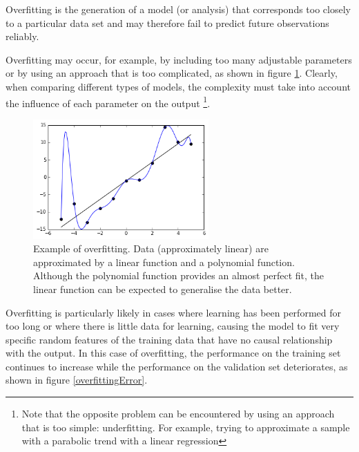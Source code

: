\begin{defi}[Overfitting]
    Overfitting is the generation of a model (or analysis) that corresponds too closely to a particular data set and may therefore fail to predict future observations reliably.
\end{defi}

Overfitting may occur, for example, by including too many adjustable parameters or by using an approach that is too complicated, as shown in figure \ref{overfittigComplex}. Clearly, when comparing different types of models, the complexity must take into account the influence of each parameter on the output \footnote{ Note that the opposite problem can be encountered by using an approach that is too simple: underfitting. For example, trying to approximate a sample with a parabolic trend with a linear regression}.

\begin{figure}[htbp]
    \centering
    \includegraphics[width=0.6\textwidth]{images/Machine learning/Overfitted_Data.png}
    \caption{Example of overfitting. Data (approximately linear) are approximated by a linear function and a polynomial function. Although the polynomial function provides an almost perfect fit, the linear function can be expected to generalise the data better. \cite{wiki:overfitting}}
    \label{overfittigComplex}
\end{figure}

\newpage

Overfitting is particularly likely in cases where learning has been performed for too long or where there is little data for learning, causing the model to fit very specific random features of the training data that have no causal relationship with the output. In this case of overfitting, the performance on the training set continues to increase while the performance on the validation set deteriorates, as shown in figure \ref{overfittingError}.



